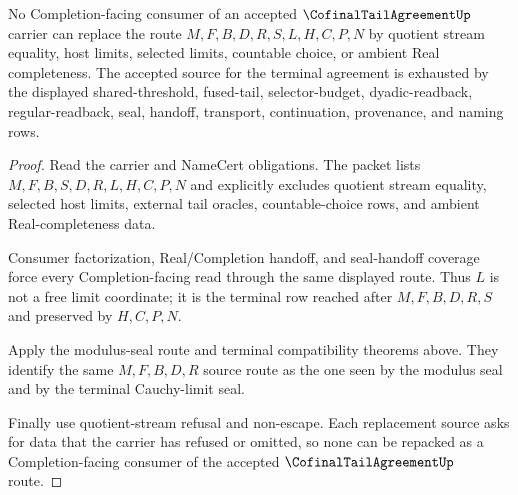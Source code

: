 \begin{theorem}
\label{thm:cofinal-tail-agreement-completion-source-exhaustion}
No Completion-facing consumer of an accepted $\CofinalTailAgreementUp$ carrier can replace the route $M,F,B,D,R,S,L,H,C,P,N$ by quotient stream equality, host limits, selected limits, countable choice, or ambient Real completeness. The accepted source for the terminal agreement is exhausted by the displayed shared-threshold, fused-tail, selector-budget, dyadic-readback, regular-readback, seal, handoff, transport, continuation, provenance, and naming rows.
\end{theorem}
\begin{proof}
Read the carrier and NameCert obligations. The packet lists $M,F,B,S,D,R,L,H,C,P,N$ and explicitly excludes quotient stream equality, selected host limits, external tail oracles, countable-choice rows, and ambient Real-completeness data.

Consumer factorization, Real/Completion handoff, and seal-handoff coverage force every Completion-facing read through the same displayed route. Thus $L$ is not a free limit coordinate; it is the terminal row reached after $M,F,B,D,R,S$ and preserved by $H,C,P,N$.

Apply the modulus-seal route and terminal compatibility theorems above. They identify the same $M,F,B,D,R$ source route as the one seen by the modulus seal and by the terminal Cauchy-limit seal.

Finally use quotient-stream refusal and non-escape. Each replacement source asks for data that the carrier has refused or omitted, so none can be repacked as a Completion-facing consumer of the accepted $\CofinalTailAgreementUp$ route.
\end{proof}

